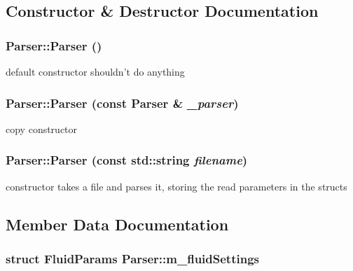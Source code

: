 \subsection{Constructor \& Destructor Documentation}
\hypertarget{classParser_a12234f6cd36b61af4b50c94a179422c1}{
\subsubsection[{Parser}]{\setlength{\rightskip}{0pt plus 5cm}Parser::Parser ()}}
\label{classParser_a12234f6cd36b61af4b50c94a179422c1}


default constructor shouldn't do anything \hypertarget{classParser_a2cc8ece9a9d047e1511ac7492d9bc4d2}{
\subsubsection[{Parser}]{\setlength{\rightskip}{0pt plus 5cm}Parser::Parser (const {\bf Parser} \& {\em \_\-parser})}}
\label{classParser_a2cc8ece9a9d047e1511ac7492d9bc4d2}


copy constructor \hypertarget{classParser_aa5750b02ac1bd78623e6bb0b9d2c0f4e}{
\subsubsection[{Parser}]{\setlength{\rightskip}{0pt plus 5cm}Parser::Parser (const std::string {\em filename})}}
\label{classParser_aa5750b02ac1bd78623e6bb0b9d2c0f4e}


constructor takes a file and parses it, storing the read parameters in the structs 

\subsection{Member Data Documentation}
\hypertarget{classParser_afa0c063fcebcccbbf37a15b034954d1b}{
\subsubsection[{m\_\-fluidSettings}]{\setlength{\rightskip}{0pt plus 5cm}struct {\bf FluidParams} {\bf Parser::m\_\-fluidSettings}}}
\label{classParser_afa0c063fcebcccbbf37a15b034954d1b}


